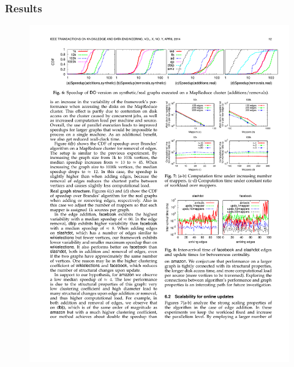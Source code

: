 \begin{frame}
  \frametitle{Results}

  \begin{figure}[t]
    \centering
    \includegraphics[width=\textwidth, height=0.3\textheight, keepaspectratio]{imgs/kdb-results21}
    \\ \qquad \quad

\end{figure}
\end{frame}
